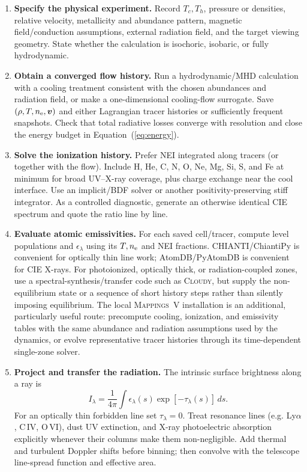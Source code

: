 \documentclass[english,a4paper]{my_memo2}
\newcommand{\nelec}{n_{\rm e}}
\begin{document}
\begin{enumerate}[leftmargin=*,label=\textbf{Step \arabic*.}]
\item \textbf{Specify the physical experiment.}  Record $T_c,T_h$, pressure
or densities, relative velocity, metallicity and abundance pattern, magnetic
field/conduction assumptions, external radiation field, and the target
viewing geometry.  State whether the calculation is isochoric, isobaric, or
fully hydrodynamic.

\item \textbf{Obtain a converged flow history.}  Run a
hydrodynamic/MHD calculation with a cooling treatment consistent with the
chosen abundances and radiation field, or make a one-dimensional cooling-flow
surrogate.  Save $(\rho,T,\nelec,\boldsymbol{v})$ and either Lagrangian tracer
histories or sufficiently frequent snapshots.  Check that total radiative
losses converge with resolution and close the energy budget in
Equation~(\ref{eq:energy}).

\item \textbf{Solve the ionization history.}  Prefer NEI integrated along
tracers (or together with the flow).  Include H, He, C, N, O, Ne, Mg, Si, S,
and Fe at minimum for broad UV--X-ray coverage, plus charge exchange near the
cool interface.  Use an implicit/BDF solver or another positivity-preserving
stiff integrator.  As a controlled diagnostic, generate an otherwise identical
CIE spectrum and quote the ratio line by line.

\item \textbf{Evaluate atomic emissivities.}  For each saved cell/tracer,
compute level populations and $\epsilon_\lambda$ using its $T,\nelec$ and NEI
fractions.  CHIANTI/ChiantiPy is convenient for optically thin line work;
AtomDB/PyAtomDB is convenient for CIE X-rays.  For photoionized, optically
thick, or radiation-coupled zones, use a spectral-synthesis/transfer code such
as \textsc{Cloudy}, but supply the non-equilibrium state or a sequence of
short history steps rather than silently imposing equilibrium.  The local
\textsc{Mappings~V} installation is an additional, particularly useful route:
precompute cooling, ionization, and emissivity tables with the same abundance
and radiation assumptions used by the dynamics, or evolve representative
tracer histories through its time-dependent single-zone solver.

\item \textbf{Project and transfer the radiation.}  The intrinsic surface
brightness along a ray is
\begin{equation}
 I_\lambda=\frac{1}{4\pi}\int\epsilon_\lambda(s)
 \exp[-\tau_\lambda(s)]\,ds.
 \label{eq:transfer}
\end{equation}
For an optically thin forbidden line set $\tau_\lambda=0$.  Treat resonance
lines (e.g. Ly$\alpha$, C\,IV, O\,VI), dust UV extinction, and X-ray
photoelectric absorption explicitly whenever their columns make them
non-negligible.  Add thermal and turbulent Doppler shifts before binning;
then convolve with the telescope line-spread function and effective area.


\end{enumerate}
\end{document}
